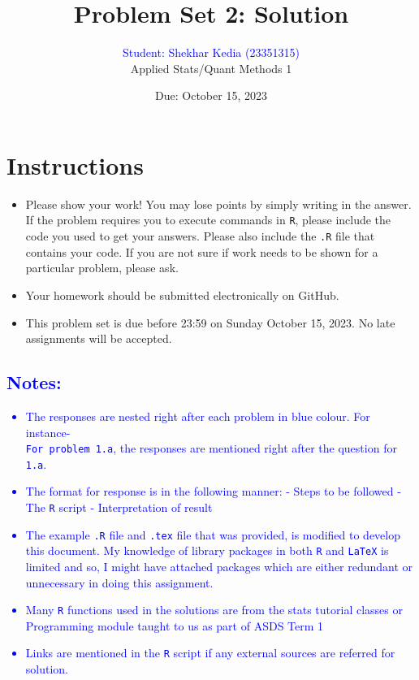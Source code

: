 \documentclass[12pt,letterpaper]{article}
\title{Problem Set 2: Solution}
\date{Due: October 15, 2023}
\author{\textcolor{blue}{Student: Shekhar Kedia (23351315)}\\
	Applied Stats/Quant Methods 1}
\begin{document}
	\maketitle

\section*{Instructions}
\begin{itemize}
	\item Please show your work! You may lose points by simply writing in the answer. If the problem requires you to execute commands in \texttt{R}, please include the code you used to get your answers. Please also include the \texttt{.R} file that contains your code. If you are not sure if work needs to be shown for a particular problem, please ask.
	\item Your homework should be submitted electronically on GitHub.
	\item This problem set is due before 23:59 on Sunday October 15, 2023. No late assignments will be accepted.

\end{itemize}

\textcolor{blue}{
\section*{Notes:}
\begin{itemize}
	\item The responses are nested right after each problem in blue colour. For instance-\\ \texttt{For problem 1.a}, the responses are mentioned right after the question for \texttt{1.a}.
	\item The format for response is in the following manner:
	\subitem - Steps to be followed
	\subitem - The \texttt{R} script
	\subitem - Interpretation of result
	\item The example \texttt{.R} file and \texttt{.tex} file that was provided, is modified to develop this document. My knowledge of library packages in both \texttt{R} and \texttt{LaTeX} is limited and so, I might have attached packages which are either redundant or unnecessary in doing this assignment.
	\item Many \texttt{R} functions used in the solutions are from the stats tutorial classes or Programming module taught to us as part of ASDS Term 1
	\item Links are mentioned in the \texttt{R} script if any external sources are referred for solution.
\end{itemize}
}	
\end{document}
